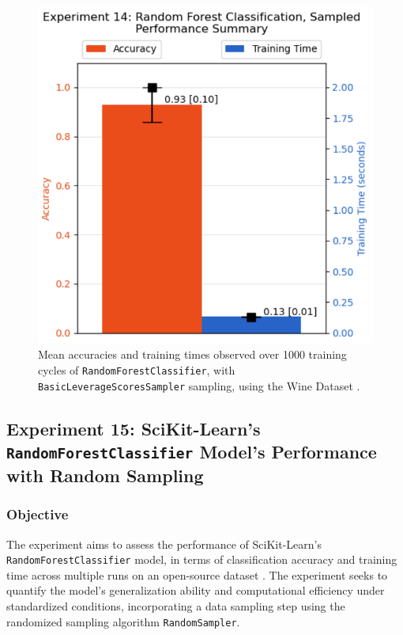 \documentclass{article}
\theoremstyle{plain}
\theoremstyle{definition}
\theoremstyle{remark}
\begin{document}
\begin{figure}[ht]
	\vskip 0.2in
	\begin{center}
		\centerline{\includegraphics[width=\columnwidth]{experiment_14}}
		\caption{Mean accuracies and training times observed over 1000 training cycles of \texttt{RandomForestClassifier}, with \texttt{BasicLeverageScoresSampler} sampling, using the Wine Dataset \cite{wine}.}
		\label{experiment_14}
	\end{center}
	\vskip -0.2in
\end{figure}


\subsection{Experiment 15: SciKit-Learn's \texttt{RandomForestClassifier} Model's Performance with Random Sampling}

\subsubsection{Objective}

The experiment aims to assess the performance of SciKit-Learn's \texttt{RandomForestClassifier} model, in terms of classification accuracy and training time across multiple runs on an open-source dataset \cite{wine}. The experiment seeks to quantify the model's generalization ability and computational efficiency under standardized conditions, incorporating a data sampling step using the randomized sampling algorithm \texttt{RandomSampler}.
\end{document}
